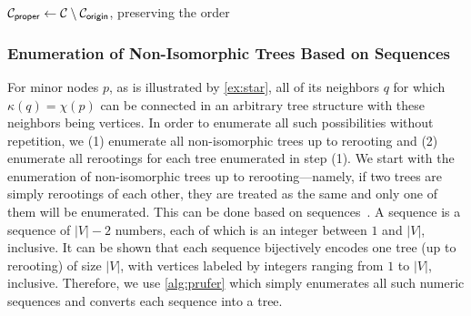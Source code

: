 \begin{algorithm}
{{    $\mathcal{C}_{\sf proper} \gets \mathcal{C} \setminus \mathcal{C}_{\sf origin}$, preserving the order \;
} 

 \;
    
}

 \;
\end{algorithm}

\subsubsection{Enumeration of Non-Isomorphic Trees Based on \prufer{} Sequences}

For minor nodes $p$, as is illustrated by \cref{ex:star}, all of its neighbors $q$ for which $\kappa(q) = \chi(p)$ can be connected in an arbitrary tree structure with these neighbors being vertices. In order to enumerate all such possibilities without repetition, we (1) enumerate all non-isomorphic trees up to rerooting and (2) enumerate all rerootings for each tree enumerated in step (1).
We start with the enumeration of non-isomorphic trees up to rerooting---namely, if two trees are simply rerootings of each other, they are treated as the same and only one of them will be enumerated. This can be done based on \prufer{} sequences~\cite{prufer_neuer_1918}. A \prufer{} sequence is a sequence of $|V| - 2$ numbers, each of which is an integer between $1$ and $|V|$, inclusive. It can be shown that each sequence bijectively encodes one tree (up to rerooting) of size $|V|$, with vertices labeled by integers ranging from $1$ to $|V|$, inclusive. Therefore, we use \cref{alg:prufer} which simply enumerates all such numeric sequences and converts each sequence into a tree.

